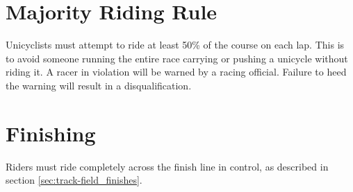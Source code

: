 \section{Majority Riding Rule}
Unicyclists must attempt to ride at least 50\% of the course on each lap.
This is to avoid someone running the entire race carrying or pushing a unicycle without riding it. 
A racer in violation will be warned by a racing official.
Failure to heed the warning will result in a disqualification.

\section{Finishing}
Riders must ride completely across the finish line in control, as described in section \ref{sec:track-field_finishes}.
